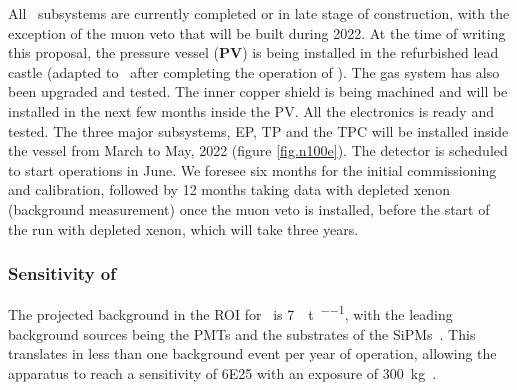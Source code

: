 All \Next\ subsystems are currently completed or in late stage of construction, with the exception of the muon veto that will be built during 2022. At the time of writing this proposal, the pressure vessel ({\bf PV}) is being installed in the refurbished lead castle (adapted to \Next\ after completing the operation of \NEW). The gas system has also been upgraded and tested. The inner copper shield is being machined and will be installed in the next few months inside the PV. All the electronics is ready and tested. The three major subsystems, EP, TP and the TPC will be installed inside the vessel from March to May, 2022 (figure \ref{fig.n100e}). The detector is scheduled to start operations in June. We foresee six months for the initial commissioning and calibration, followed by 12 months taking data with depleted xenon (background measurement) once the muon veto is installed, before the start of the run with depleted xenon, which will take three years. 


\subsubsection{Sensitivity of \Next}

The projected background in the ROI for \Next\ is \SI{7}{\ev\per\tonne\per\yr}, with the leading background sources being the PMTs and the substrates of the SiPMs~\cite{Martin-Albo:2015rhw}.  This translates in less than one background event per year of operation, allowing the apparatus to reach 
a sensitivity of \SI{6E25}{\yr} with an exposure of \SI{300}{\kg\yr}. 

\indent

